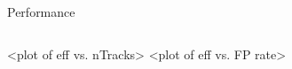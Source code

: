 \begin{frame}{Performance}
\begin{columns}
<plot of eff vs. nTracks>
<plot of eff vs. FP rate>
\end{columns}
\end{frame}
